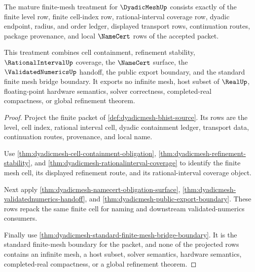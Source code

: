 \begin{theorem}
\label{thm:dyadicmesh-mature-finite-mesh-treatment}
The mature finite-mesh treatment for $\DyadicMeshUp$ consists exactly of the
finite level row, finite cell-index row, rational-interval coverage row,
dyadic endpoint, radius, and order ledger, displayed transport rows,
continuation routes, package provenance, and local $\NameCert$ rows of the
accepted packet.

This treatment combines cell containment, refinement stability,
$\RationalIntervalUp$ coverage, the $\NameCert$ surface, the
$\ValidatedNumericsUp$ handoff, the public export boundary, and the standard
finite mesh bridge boundary. It exports no infinite mesh, host subset of
$\RealUp$, floating-point hardware semantics, solver correctness,
completed-real compactness, or global refinement theorem.
\end{theorem}
\begin{proof}
Project the finite packet of \autoref{def:dyadicmesh-bhist-source}. Its rows
are the level, cell index, rational interval cell, dyadic containment ledger,
transport data, continuation routes, provenance, and local name.

Use \autoref{thm:dyadicmesh-cell-containment-obligation},
\autoref{thm:dyadicmesh-refinement-stability}, and
\autoref{thm:dyadicmesh-rationalinterval-coverage} to identify the finite
mesh cell, its displayed refinement route, and its rational-interval coverage
object.

Next apply \autoref{thm:dyadicmesh-namecert-obligation-surface},
\autoref{thm:dyadicmesh-validatednumerics-handoff}, and
\autoref{thm:dyadicmesh-public-export-boundary}. These rows repack the same
finite cell for naming and downstream validated-numerics consumers.

Finally use \autoref{thm:dyadicmesh-standard-finite-mesh-bridge-boundary}. It
is the standard finite-mesh boundary for the packet, and none of the projected
rows contains an infinite mesh, a host subset, solver semantics, hardware
semantics, completed-real compactness, or a global refinement theorem.
\end{proof}


